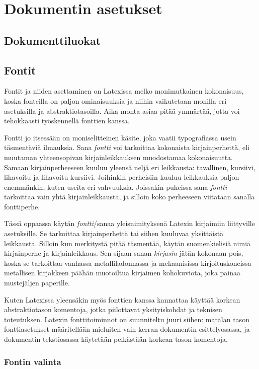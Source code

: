 \chapter{Dokumentin asetukset}
\section{Dokumenttiluokat}
\label{luku:dokumenttiluokat}
\section{Fontit}
\label{luku:kirjaintyypit}

Fontit ja niiden asettaminen on Latexissa melko monimutkainen
kokonaisuus, koska fonteilla on paljon ominaisuuksia ja niihin
vaikutetaan monilla eri asetuksilla ja abstraktiotasoilla. Aika monta
asiaa pitää ymmärtää, jotta voi tehokkaasti työskennellä fonttien
kanssa.

Fontti jo itsessään on moniselitteinen käsite, joka vaatii typografiassa
usein täsmentäviä ilmauksia. Sana \emph{fontti} voi tarkoittaa
kokonaista kirjainperhettä, eli muutaman yhteensopivan
kirjainleikkauksen muodostamaa kokonaisuutta. Samaan kirjainperheeseen
kuuluu yleensä neljä eri leikkausta: tavallinen, kursiivi, lihavoitu ja
lihavoitu kursiivi. Joihinkin perheisiin kuuluu leikkauksia paljon
enemmänkin, kuten useita eri vahvuuksia. Joissakin puheissa sana
\emph{fontti} tarkoittaa vain yhtä kirjainleikkausta, ja silloin koko
perheeseen viitataan sanalla fonttiperhe.

Tässä oppaassa käytän \emph{fontti}\-/sanaa yleisnimityksenä Latexin
kirjaimiin liittyville asetuksille. Se tarkoittaa kirjainperhettä tai
siihen kuuluvaa yksittäistä leikkausta. Silloin kun merkitystä pitää
täsmentää, käytän suomenkielisiä nimiä kirjainperhe ja kirjainleikkaus.
Sen sijaan sanan \emph{kirjasin} jätän kokonaan pois, koska se
tarkoittaa vanhassa metalliladonnassa ja mekaanisissa kirjoituskoneissa
metallisen kirjakkeen päähän muotoiltua kirjaimen kohokuviota, joka
painaa mustejäljen paperille.

Kuten Latexissa yleensäkin myös fonttien kanssa kannattaa käyttää
korkean abstraktiotason komentoja, jotka piilottavat yksityiskohdat ja
teknisen toteutuksen. Latexin fonttitoiminnot on suunniteltu juuri
siihen: matalan tason fontti\-asetukset määritellään mieluiten vain
kerran dokumentin esittely\-osassa, ja dokumentin teksti\-osassa
käytetään pelkästään korkean tason komentoja.

\subsection{Fontin valinta}

